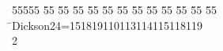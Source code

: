 %
%
\begin{tabbing}
55555 \= 55 \= 55 \= 55 \= 55 \= 55 \= 55 \= 55 \= 55 \= 55 \= 55 \= 55 \= 55 \= \>Dickson24=151819110113114115118119\\[0pt]
2\>\end{tabbing}
